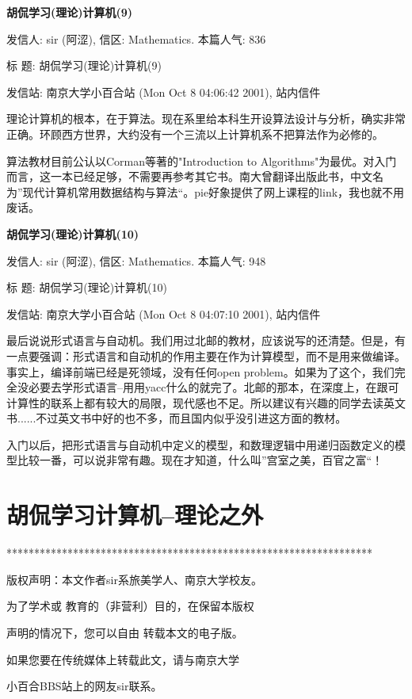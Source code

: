 \textbf{胡侃学习(理论)计算机(9)}


发信人: sir (阿涩), 信区: Mathematics. 本篇人气: 836

标  题: 胡侃学习(理论)计算机(9)\cite{sir9}

发信站: 南京大学小百合站 (Mon Oct  8 04:06:42 2001), 站内信件

理论计算机的根本，在于算法。现在系里给本科生开设算法设计与分析，确实非常正确。环顾西方世界，大约没有一个三流以上计算机系不把算法作为必修的。

算法教材目前公认以Corman等著的"Introduction to Algorithms"为最优。对入门而言，这一本已经足够，不需要再参考其它书。南大曾翻译出版此书，中文名为”现代计算机常用数据结构与算法“。pie好象提供了网上课程的link，我也就不用废话。


\textbf{胡侃学习(理论)计算机(10)}


发信人: sir (阿涩), 信区: Mathematics. 本篇人气: 948

标  题: 胡侃学习(理论)计算机(10)\cite{sir10}

发信站: 南京大学小百合站 (Mon Oct  8 04:07:10 2001), 站内信件


最后说说形式语言与自动机。我们用过北邮的教材，应该说写的还清楚。但是，有一点要强调：形式语言和自动机的作用主要在作为计算模型，而不是用来做编译。事实上，编译前端已经是死领域，没有任何open problem。如果为了这个，我们完全没必要去学形式语言--用用yacc什么的就完了。北邮的那本，在深度上，在跟可计算性的联系上都有较大的局限，现代感也不足。所以建议有兴趣的同学去读英文书......不过英文书中好的也不多，而且国内似乎没引进这方面的教材。

入门以后，把形式语言与自动机中定义的模型，和数理逻辑中用递归函数定义的模型比较一番，可以说非常有趣。现在才知道，什么叫”宫室之美，百官之富“！





\chapter{胡侃学习计算机--理论之外}

******************************************************************  

版权声明：本文作者sir系旅美学人、南京大学校友。 

为了学术或 教育的（非营利）目的，在保留本版权

声明的情况下，您可以自由 转载本文的电子版。

如果您要在传统媒体上转载此文，请与南京大学

小百合BBS站上的网友sir联系。 

